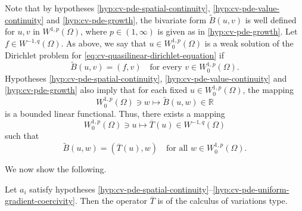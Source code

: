Note that by hypotheses \ref{hyp:cv-pde-spatial-continuity}, \ref{hyp:cv-pde-value-continuity} and \ref{hyp:cv-pde-growth}, the bivariate form $\widetilde B(u,v)$ is well defined for $u,v$ in $W^{1,p}(\Omega)$, where $p\in(1,\infty)$ is given as in \ref{hyp:cv-pde-growth}. Let $f\in W^{-1,q}(\Omega)$. As above, we say that $u\in W_0^{1,p}(\Omega)$ is a weak solution of the Dirichlet problem for \eqref{eq:cv-quasilinear-dirichlet-equation} if
\begin{equation}\label{eq:cv-quasilinear-dirichlet-weak-solution}
\widetilde B(u,v)=(f,v)\quad\text{for every }v\in W_0^{1,p}(\Omega).
\end{equation}
Hypotheses \ref{hyp:cv-pde-spatial-continuity}, \ref{hyp:cv-pde-value-continuity} and \ref{hyp:cv-pde-growth} also imply that for each fixed $u\in W_0^{1,p}(\Omega)$, the mapping
\begin{equation}\label{eq:cv-quasilinear-bounded-test-functional}
W_0^{1,p}(\Omega)\ni w\mapsto\widetilde B(u,w)\in\mathbb{R}
\end{equation}
is a bounded linear functional. Thus, there exists a mapping
\begin{equation}\label{eq:cv-quasilinear-induced-dual-mapping}
W_0^{1,p}(\Omega)\ni u\mapsto\overline T(u)\in W^{-1,q}(\Omega)
\end{equation}
such that
\begin{equation}\label{eq:cv-quasilinear-induced-pairing}
\widetilde B(u,w)=(\overline T(u),w)\quad\text{for all }w\in W_0^{1,p}(\Omega).
\end{equation}


We now show the following.

\begin{Theorem}
\label{thm:cv-pde-operator-is-variations-type}
Let $a_i$ satisfy hypotheses \ref{hyp:cv-pde-spatial-continuity}--\ref{hyp:cv-pde-uniform-gradient-coercivity}. Then the operator $\overline T$ is of the calculus of variations type.
\end{Theorem}

